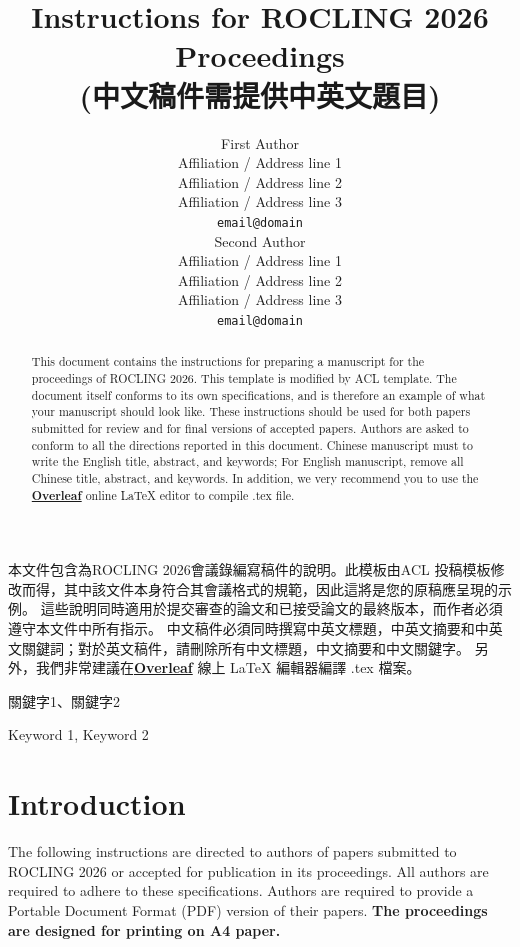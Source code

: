 \documentclass[11pt,a4paper]{article}
\title{Instructions for ROCLING 2026 Proceedings \\ (中文稿件需提供中英文題目)}
\author{First Author \\
  Affiliation / Address line 1 \\
  Affiliation / Address line 2 \\
  Affiliation / Address line 3 \\
  \texttt{email@domain} \\\And
  Second Author \\
  Affiliation / Address line 1 \\
  Affiliation / Address line 2 \\
  Affiliation / Address line 3 \\
  \texttt{email@domain} \\}
\date{}
\begin{document}
\maketitle

\begin{abstractChinese}
本文件包含為ROCLING 2026會議錄編寫稿件的說明。此模板由ACL 投稿模板修改而得，其中該文件本身符合其會議格式的規範，因此這將是您的原稿應呈現的示例。
這些說明同時適用於提交審查的論文和已接受論文的最終版本，而作者必須遵守本文件中所有指示。
中文稿件必須同時撰寫中英文標題，中英文摘要和中英文關鍵詞；對於英文稿件，請刪除所有中文標題，中文摘要和中文關鍵字。
另外，我們非常建議在\href{https://www.overleaf.com/}{\textbf{Overleaf}} 線上 \LaTeX{}  編輯器編譯 .tex 檔案。
\end{abstractChinese}

\begin{abstract}
This document contains the instructions for preparing a manuscript for the proceedings of ROCLING 2026. This template is modified by ACL template.
The document itself conforms to its own specifications, and is therefore an example of what your manuscript should look like. 
These instructions should be used for both papers submitted for review and for final versions of accepted papers. 
Authors are asked to conform to all the directions reported in this document. 
Chinese manuscript must to write the English title, abstract, and keywords; For English manuscript, remove all Chinese title, abstract, and keywords.
In addition, we very recommend you to use the \href{https://www.overleaf.com/}{\textbf{Overleaf}} online \LaTeX{}  editor to compile .tex file.
\end{abstract}

\begin{keywordsChinese}
關鍵字1、關鍵字2
\end{keywordsChinese}

\begin{keywords}
Keyword 1, Keyword 2
\end{keywords}

\section{Introduction}

The following instructions are directed to authors of papers submitted to ROCLING  2026 or accepted for publication in its proceedings.
All authors are required to adhere to these specifications.
Authors are required to provide a Portable Document Format (PDF) version of their papers.
\textbf{The proceedings are designed for printing on A4 paper.}
\end{document}
